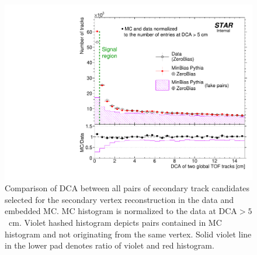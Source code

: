 %
\begin{figure}[t!]\vspace{-2pt}%
\centering%
\begin{minipage}{.4725\textwidth}%
  \centering%
  \includegraphics[width=\linewidth]{graphics/deadMaterial/DcaOfTwoGlobalTofTrksWithLargeD0_DataVsMC.pdf}\vspace{-5pt}%
  \caption[Comparison of DCA between all pairs of secondary track candidates selected for the secondary vertex reconstruction in the data and embedded MC.]%
  {Comparison of DCA between all pairs of secondary track candidates selected for the secondary vertex reconstruction  in the data and embedded MC. MC histogram is normalized to the data at $\text{DCA}>5$~cm. Violet hashed histogram depicts pairs contained in MC histogram and not originating from the same vertex. Solid violet line in the lower pad denotes ratio of violet and red histogram.\newline\newline }\label{fig:DcaOfTwoGlobalTofTrksWithLargeD0_DataVsMC}
\end{minipage}%
\quad\quad%
\begin{minipage}{.4725\textwidth}%
  \centering%

\end{minipage}
\end{figure}

